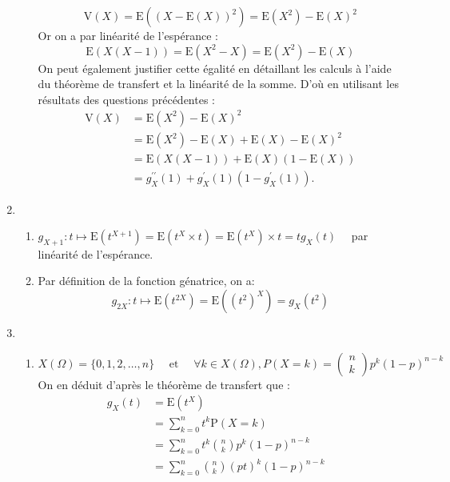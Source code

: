 \begin{correction}
\begin{enumerate}
\begin{enumerate}
$$
\mathrm{V}(X)=\mathrm{E}\left((X-\mathrm{E}(X))^{2}\right)=\mathrm{E}\left(X^{2}\right)-\mathrm{E}(X)^{2}
$$
Or on a par linéarité de l'espérance :
$$
\mathrm{E}(X(X-1))=\mathrm{E}\left(X^{2}-X\right)=\mathrm{E}\left(X^{2}\right)-\mathrm{E}(X)
$$
 On peut également justifier cette égalité en détaillant les calculs à l'aide du  théorème de transfert et la linéarité de la somme.  D'où en utilisant les résultats des questions précédentes :
 \begin{align*}
\mathrm{V}(X) &=\mathrm{E}\left(X^{2}\right)-\mathrm{E}(X)^{2}\\
					&=\mathrm{E}\left(X^{2}\right)-\mathrm{E}(X)+\mathrm{E}(X)-\mathrm{E}(X)^{2}\\
					&=\mathrm{E}(X(X-1))+\mathrm{E}(X)(1-\mathrm{E}(X)) \\
					&= g_{X}^{\prime \prime}(1)+g_{X}^{\prime}(1)\left(1-g_{X}^{\prime}(1)\right) .
\end{align*}  


\end{enumerate}
\item
\begin{enumerate}
\item $g_{X+1}: t \mapsto \mathrm{E}\left(t^{X+1}\right)=\mathrm{E}\left(t^{X} \times t\right)=\mathrm{E}\left(t^{X}\right) \times t=t g_{X}(t) \quad$ par linéarité de l'espérance.


\item Par définition de la fonction génatrice, on a:
$$
g_{2 X}: t \mapsto \mathrm{E}\left(t^{2 X}\right)=\mathrm{E}\left(\left(t^{2}\right)^{X}\right)=g_{X}\left(t^{2}\right)
$$
\end{enumerate}
\item \begin{enumerate}
\item $$
X(\Omega)=\{0,1,2, \ldots, n\} \quad \text { et } \quad \forall k \in X(\Omega), P(X=k)=\left(\begin{array}{l}
n \\
k
\end{array}\right) p^{k}(1-p)^{n-k}
$$
On en déduit d'après le théorème de transfert que :
\begin{align*}
g_{X}( t)&=\mathrm{E}\left(t^{X}\right)&\\
	&=\sum_{k=0}^{n} t^{k} \mathrm{P}(X=k)\\
	&=\sum_{k=0}^{n} t^{k}\binom{n}{k}p^{k}(1-p)^{n-k}\\
&=\sum_{k=0}^{n}\binom{n}{k}(p t)^{k}(1-p)^{n-k}
\end{align*}


\end{enumerate}
\end{enumerate}
\end{correction}
